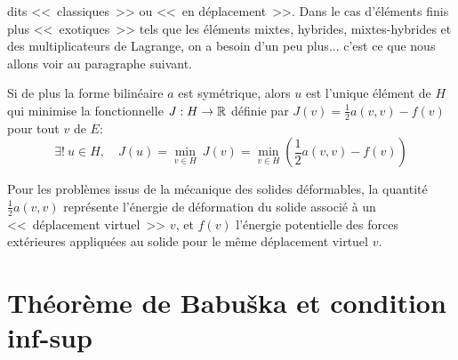 \medskip
{} dits <<~classiques~>> ou <<~en déplacement~>>.
Dans le cas d'éléments finis plus <<~exotiques~>> tels que les éléments
mixtes, hybrides, mixtes-hybrides et des multiplicateurs de Lagrange, on a besoin d'un peu plus... c'est ce que nous allons voir au paragraphe suivant.


\begin{theoreme}
Si de plus la forme bilinéaire $a$ est symétrique, alors $u$ est
l'unique élément de $H$ qui minimise la fonctionnelle
$J: H\rightarrow\mathbb R$ définie par $J(v) = \frac12 a(v,v)-f(v)$ pour tout $v$ de $E$:
\begin{equation}
\exists!\ u \in H,\quad J(u) = \min_{v\in H}\ J(v) = \min_{v\in H} \left( \frac12 a(v,v) - f(v) \right)
\end{equation}
\end{theoreme}


\medskip



Pour les problèmes issus de la mécanique des solides déformables, la quantité $\frac12 a(v,v)$ représente l'énergie de déformation du solide associé à un <<~déplacement virtuel~>> $v$, et $f(v)$ l'énergie potentielle des forces extérieures appliquées au solide pour le même déplacement virtuel $v$.


\medskip
\section{Théorème de Babuška et condition inf-sup}\label{Sec-ThBabuska}


